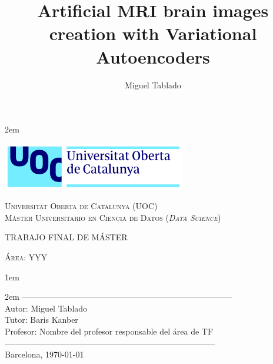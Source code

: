 \newpage
\thispagestyle{empty}

\baselineskip 2em


\centerline{\includegraphics[width=0.6\textwidth]{images/UOC-logo}}
\begin{center}
\textsc{Universitat Oberta de Catalunya (UOC) \\
 Máster Universitario en Ciencia de Datos (\textit{Data Science})\\}


\vspace*{1.5cm}

\textsc{\Large TRABAJO FINAL DE MÁSTER}

\vspace*{0.5cm}

\textsc{\large Área: YYY}



\vspace*{2.0cm}

\title{\Large Artificial MRI brain images creation with Variational Autoencoders}

\vspace{2.5cm}
\baselineskip 1em

\baselineskip 2em
-----------------------------------------------------------------------------\\
Autor:      Miguel Tablado\\
Tutor:      Baris Kanber\\
Profesor:   Nombre del profesor responsable del área de TF\\
-----------------------------------------------------------------------------\\
\vspace*{1.5cm}
Barcelona, \today

\author{Miguel Tablado}

\end{center}
